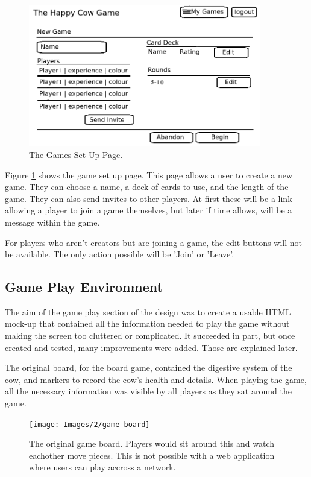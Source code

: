 \begin{figure}[ht]
\centering
\includegraphics[width=4in]{Images/2/pages-6-new}
\caption{The Games Set Up Page.}
\label{2_page_setup}
\end{figure}
Figure \ref{2_page_setup} shows the game set up page. This page allows a user to create a new game. They can choose a name, a deck of cards to use, and the length of the game. They can also send invites to other players. At first these will be a link allowing a player to join a game themselves, but later if time allows, will be a message within the game. 

For players who aren’t creators but are joining a game, the edit buttons will not be available. 
The only action possible will be ’Join’ or ’Leave’.

\subsection{Game Play Environment}
The aim of the game play section of the design was to create a usable HTML mock-up that contained all the information needed to play the game without making the screen too cluttered or complicated. It succeeded in part, but once created and tested, many improvements were added. Those are explained later.

The original board, for the board game, contained the digestive system of the cow, and markers to record the cow's health and details. When playing the game, all the necessary information was visible by all players as they sat around the game.

\begin{figure}[ht]
\centering
\texttt{[image: Images/2/game-board]}
\caption{The original game board. Players would sit around this and watch eachother move pieces. This is not possible with a web application where users can play accross a network.}
\label{2_play_board}
\end{figure}

